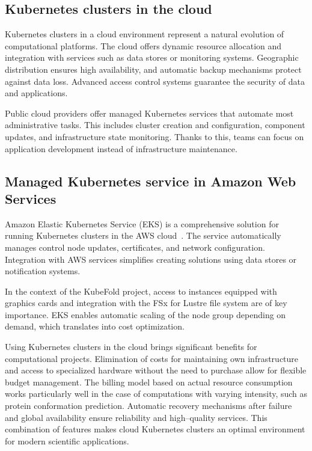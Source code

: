 \subsection{Kubernetes clusters in the cloud}

Kubernetes clusters in a cloud environment represent a natural evolution of computational platforms.
The cloud offers dynamic resource allocation and integration with services such as data stores or monitoring systems.
Geographic distribution ensures high availability, and automatic backup mechanisms protect against data loss.
Advanced access control systems guarantee the security of data and applications.

Public cloud providers offer managed Kubernetes services that automate most administrative tasks.
This includes cluster creation and configuration, component updates, and infrastructure state monitoring.
Thanks to this, teams can focus on application development instead of infrastructure maintenance.

\subsection{Managed Kubernetes service in Amazon Web Services}\label{subsec:aws-eks}

Amazon Elastic Kubernetes Service (EKS) is a comprehensive solution for running Kubernetes clusters in the AWS cloud~\cite{amazon_eks}.
The service automatically manages control node updates, certificates, and network configuration.
Integration with AWS services simplifies creating solutions using data stores or notification systems.

In the context of the KubeFold project, access to instances equipped with graphics cards and integration with the FSx for Lustre file system are of key importance.
EKS enables automatic scaling of the node group depending on demand, which translates into cost optimization.

Using Kubernetes clusters in the cloud brings significant benefits for computational projects.
Elimination of costs for maintaining own infrastructure and access to specialized hardware without the need to purchase allow for flexible budget management.
The billing model based on actual resource consumption works particularly well in the case of computations with varying intensity, such as protein conformation prediction.
Automatic recovery mechanisms after failure and global availability ensure reliability and high--quality services.
This combination of features makes cloud Kubernetes clusters an optimal environment for modern scientific applications.


